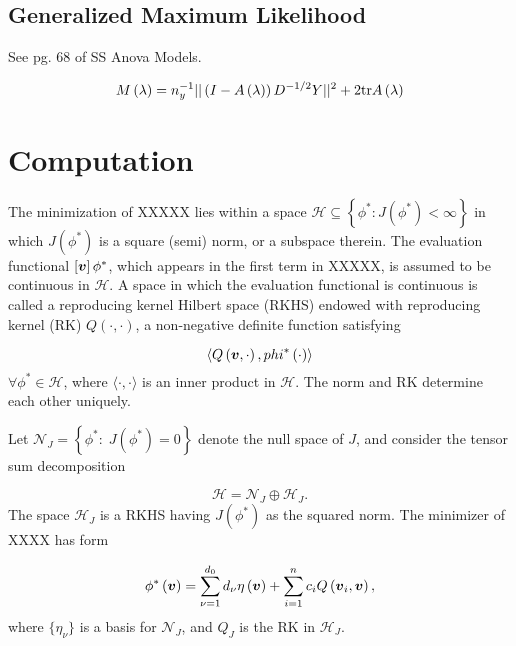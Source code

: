 \documentclass[12pt]{article}
\newcommand{\Hilbert}{\mathcal{H}}
\newcommand{\bfv}{\mbox{\boldmath $v$}}
\theoremstyle{definition}
\begin{document}
\subsection{Generalized Maximum Likelihood}

See pg. 68 of SS Anova Models.

\[
M\left(\lambda\right) = n_y^{-1} \vert \vert \left( I - A\left(\lambda\right)\right)D^{-1/2} Y\vert \vert^2 + 2\textup{tr}A\left(\lambda\right)
\]









\section{Computation}

The minimization of XXXXX lies within a space $\Hilbert \subseteq \left \{ \phi^*: J\left(\phi^*\right) < \infty \right\}$ in which $J\left(\phi^*\right)$ is a square (semi) norm, or a subspace therein. The evaluation functional $\left[ \bfv \right] \phi^*$, which appears in the first term in XXXXX, is assumed to be continuous in $\Hilbert$. A space in which the evaluation functional is continuous is called a reproducing kernel Hilbert space (RKHS) endowed with reproducing kernel (RK) $Q\left(\cdot, \cdot\right)$, a non-negative definite function satisfying 

\[
\langle Q\left(\bfv,\cdot\right), phi^*\left(\cdot\right) \rangle
\]
\bigskip
\noindent
$\forall \phi^* \in \Hilbert$, where $\langle \cdot, \cdot \rangle$ is an inner product in $\Hilbert$. The norm and RK determine each other uniquely.

Let $\mathcal{N}_J = \left\{ \phi^*:\; J\left(\phi^*\right) = 0\right\}$ denote the null space of $J$, and consider the tensor sum decomposition

\[
\Hilbert = \mathcal{N}_J \oplus \Hilbert_J.
\]
\noindent
The space $\Hilbert_J$ is a RKHS having $J\left(\phi^*\right)$ as the squared norm. The minimizer of XXXX has form 

\begin{equation} \label{eq:RKHS-functional-form}
\phi^*\left(\bfv\right) = \sum_{\nu = 1}^{d_0} d_\nu \eta\left( \bfv \right) + \sum_{i=1}^n c_i Q\left(\bfv_i, \bfv \right),
\end{equation} 
\bigskip
\noindent
where $\lbrace \eta_\nu \rbrace$ is a basis for $\mathcal{N}_J$, and $Q_J$ is the RK in $\Hilbert_J$. 
\end{document}

